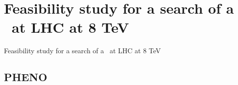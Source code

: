 \section[Pheno]{Feasibility study for a search of a \Tp~at LHC at 8 TeV}
\setcounter{tocdepth}{2}

\begin{frame}
\begin{center}
Feasibility study for a search of a \Tp~at LHC at 8 TeV
\end{center}
\end{frame}

\subsection{PHENO}

\begin{frame}

\end{frame}



